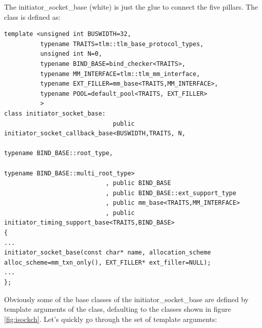 \documentclass[a4paper,10pt]{article}          %
\newcommand{\code}[1]{{\ttfamily#1}}
\begin{document}
The \code{initiator\_socket\_base} (white) is just the glue to connect the five pillars. The class is defined as:

\begin{lstlisting}
template <unsigned int BUSWIDTH=32,
          typename TRAITS=tlm::tlm_base_protocol_types,
          unsigned int N=0,
          typename BIND_BASE=bind_checker<TRAITS>,
          typename MM_INTERFACE=tlm::tlm_mm_interface,
          typename EXT_FILLER=mm_base<TRAITS,MM_INTERFACE>,
          typename POOL=default_pool<TRAITS, EXT_FILLER>
          >
class initiator_socket_base: 
                              public initiator_socket_callback_base<BUSWIDTH,TRAITS, N, 
                                                                    typename BIND_BASE::root_type, 
                                                                    typename BIND_BASE::multi_root_type>
                            , public BIND_BASE
                            , public BIND_BASE::ext_support_type
                            , public mm_base<TRAITS,MM_INTERFACE>
                            , public initiator_timing_support_base<TRAITS,BIND_BASE>
{
...
initiator_socket_base(const char* name, allocation_scheme alloc_scheme=mm_txn_only(), EXT_FILLER* ext_filler=NULL);
...
};

\end{lstlisting}

Obviously some of the base classes of the \code{initiator\_socket\_base} are defined by template arguments of the class, defaulting to the classes shown in figure \ref{fig:isockch}. Let's quickly go through the set of template arguments:
\end{document}
